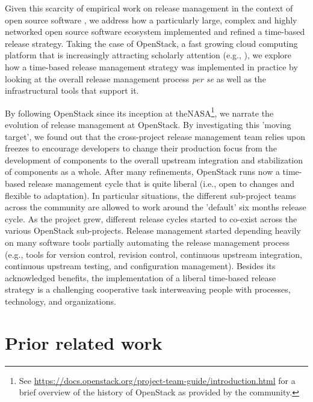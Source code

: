 \documentclass[dvipsnames]{bmcart}
\theoremstyle{definition}
\begin{document}
Given this scarcity of empirical work on release management in the context of open source software \cite{michlmayr2015and,Poo-Caamano2017},
we address how a particularly large, complex and highly networked open source software ecosystem implemented and refined a time-based release strategy. Taking the case of OpenStack, a fast growing cloud computing platform that is increasingly attracting scholarly attention   (e.g., \cite{wuhib2012dynamic,corradi2014vm,teixeira2015lessons,ge2015openanfv,malik2017measurement}), we explore how a time-based release management strategy was implemented in practice  by looking at the overall release management process \textit{per se} 
 as well as the infrastructural tools that support it. 

 
By following OpenStack since its inception at the\ac{NASA}\footnote{\label{noteHistory}See \url{https://docs.openstack.org/project-team-guide/introduction.html} for a brief overview of the history of OpenStack as provided by the community.},
we narrate the evolution of release management at OpenStack. By investigating this 'moving target', we found out that the cross-project release management team relies upon freezes to encourage developers to change their production focus from the development of components to the overall upstream integration and stabilization of components as a whole. After many refinements, OpenStack runs now a time-based release management cycle that is quite liberal (i.e., open to changes and flexible to adaptation). In particular situations, the different sub-project teams across the community are allowed to work around the 'default' six months release cycle. As the project grew, different release cycles started to co-exist across the various OpenStack sub-projects.  Release management started depending heavily on many software tools partially automating the release management process (e.g., tools for version control, revision control, continuous upstream integration, continuous upstream testing, and configuration management).  
Besides its acknowledged benefits, the implementation of a liberal time-based release strategy is a challenging cooperative task interweaving people with processes, technology, and organizations.
 
\section{Prior related work}
\end{document}

